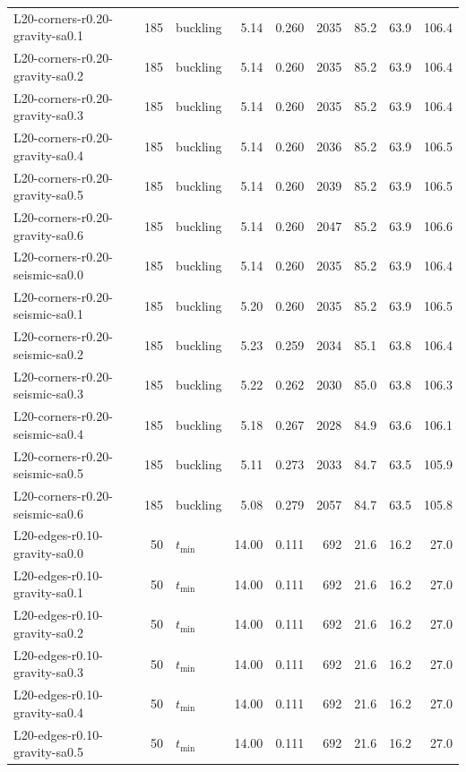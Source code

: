 \begin{longtable}{lrlrrrrrr}
L20-corners-r0.20-gravity-sa0.1 & 185 & buckling & 5.14 & 0.260 & 2035 & 85.2 & 63.9 & 106.4 \\
L20-corners-r0.20-gravity-sa0.2 & 185 & buckling & 5.14 & 0.260 & 2035 & 85.2 & 63.9 & 106.4 \\
L20-corners-r0.20-gravity-sa0.3 & 185 & buckling & 5.14 & 0.260 & 2035 & 85.2 & 63.9 & 106.4 \\
L20-corners-r0.20-gravity-sa0.4 & 185 & buckling & 5.14 & 0.260 & 2036 & 85.2 & 63.9 & 106.5 \\
L20-corners-r0.20-gravity-sa0.5 & 185 & buckling & 5.14 & 0.260 & 2039 & 85.2 & 63.9 & 106.5 \\
L20-corners-r0.20-gravity-sa0.6 & 185 & buckling & 5.14 & 0.260 & 2047 & 85.2 & 63.9 & 106.6 \\
L20-corners-r0.20-seismic-sa0.0 & 185 & buckling & 5.14 & 0.260 & 2035 & 85.2 & 63.9 & 106.4 \\
L20-corners-r0.20-seismic-sa0.1 & 185 & buckling & 5.20 & 0.260 & 2035 & 85.2 & 63.9 & 106.5 \\
L20-corners-r0.20-seismic-sa0.2 & 185 & buckling & 5.23 & 0.259 & 2034 & 85.1 & 63.8 & 106.4 \\
L20-corners-r0.20-seismic-sa0.3 & 185 & buckling & 5.22 & 0.262 & 2030 & 85.0 & 63.8 & 106.3 \\
L20-corners-r0.20-seismic-sa0.4 & 185 & buckling & 5.18 & 0.267 & 2028 & 84.9 & 63.6 & 106.1 \\
L20-corners-r0.20-seismic-sa0.5 & 185 & buckling & 5.11 & 0.273 & 2033 & 84.7 & 63.5 & 105.9 \\
L20-corners-r0.20-seismic-sa0.6 & 185 & buckling & 5.08 & 0.279 & 2057 & 84.7 & 63.5 & 105.8 \\
L20-edges-r0.10-gravity-sa0.0 & 50 & $t_{\mathrm{min}}$ & 14.00 & 0.111 & 692 & 21.6 & 16.2 & 27.0 \\
L20-edges-r0.10-gravity-sa0.1 & 50 & $t_{\mathrm{min}}$ & 14.00 & 0.111 & 692 & 21.6 & 16.2 & 27.0 \\
L20-edges-r0.10-gravity-sa0.2 & 50 & $t_{\mathrm{min}}$ & 14.00 & 0.111 & 692 & 21.6 & 16.2 & 27.0 \\
L20-edges-r0.10-gravity-sa0.3 & 50 & $t_{\mathrm{min}}$ & 14.00 & 0.111 & 692 & 21.6 & 16.2 & 27.0 \\
L20-edges-r0.10-gravity-sa0.4 & 50 & $t_{\mathrm{min}}$ & 14.00 & 0.111 & 692 & 21.6 & 16.2 & 27.0 \\
L20-edges-r0.10-gravity-sa0.5 & 50 & $t_{\mathrm{min}}$ & 14.00 & 0.111 & 692 & 21.6 & 16.2 & 27.0 \\

\end{longtable}
